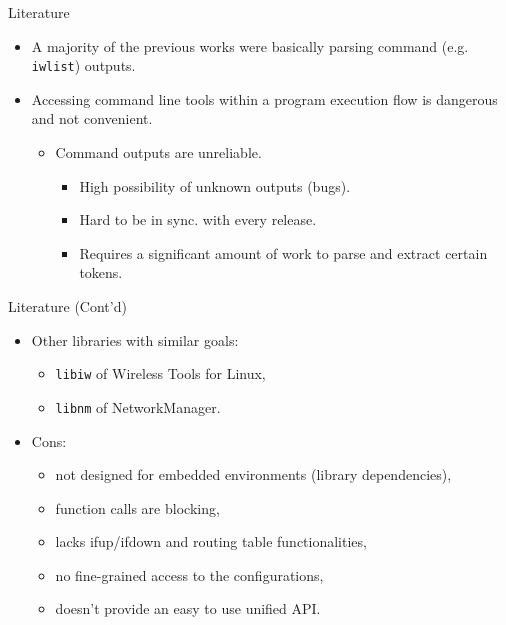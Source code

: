 \documentclass[turkish,12pt,red,compress,mathserif]{beamer}
\begin{document}
\begin{frame}{Literature}
  \begin{itemize}
  \item A majority of the previous works were basically parsing command (e.g.
    \texttt{iwlist}) outputs.
  \item Accessing command line tools within a program execution flow is
    dangerous and not convenient.
    \begin{itemize}
    \item Command outputs are unreliable.
      \begin{itemize}
      \item High possibility of unknown outputs (bugs).
      \item Hard to be in sync. with every release.
      \item Requires a significant amount of work to parse and extract certain
        tokens.
      \end{itemize}
    \end{itemize}
  \end{itemize}
\end{frame}

\begin{frame}{Literature (Cont'd)}
  \begin{itemize}
  \item Other libraries with similar goals:
    \begin{itemize}
    \item \texttt{libiw} of Wireless Tools for Linux,
    \item \texttt{libnm} of NetworkManager.
    \end{itemize}
  \item Cons:
    \begin{itemize}
    \item not designed for embedded environments (library dependencies),
    \item function calls are blocking,
    \item lacks ifup/ifdown and routing table functionalities,
    \item no fine-grained access to the configurations,
    \item doesn't provide an easy to use unified API.
    \end{itemize}
  \end{itemize}
\end{frame}

\end{document}
